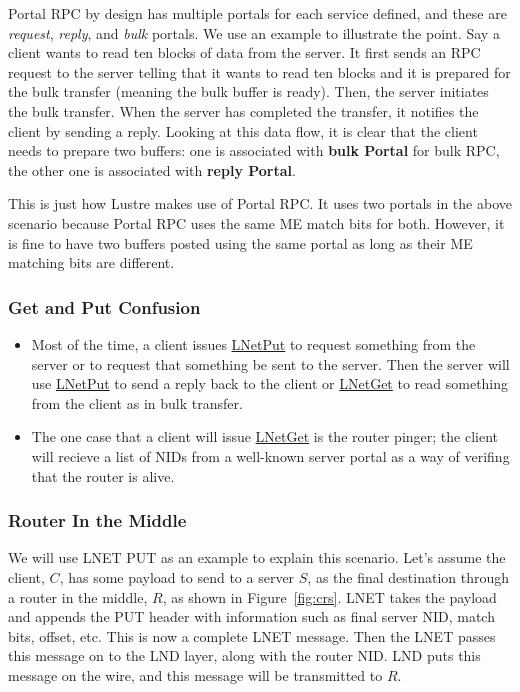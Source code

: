 Portal RPC by design has multiple portals for each service defined, and these
are \textit{request}, \textit{reply}, and \textit{bulk} portals.  We use an
example to illustrate the point. Say a client wants to read ten blocks of data
from the server. It first sends an RPC request to the server telling that it
wants to read ten blocks and it is prepared for the bulk transfer (meaning the
bulk buffer is ready). Then, the server initiates the bulk transfer. When the
server has completed the transfer, it notifies the client by sending a reply.
Looking at this data flow, it is clear that the client needs to prepare two
buffers: one is associated with \textbf{bulk Portal} for bulk RPC, the other
one is associated with \textbf{reply Portal}.

This is just how Lustre makes use of Portal RPC. It uses two portals in the
above scenario because Portal RPC uses the same ME match bits for both.
However, it is fine to have two buffers posted using the same portal as long as
their ME matching bits are different.

\subsubsection*{Get and Put Confusion}

\begin{itemize}

\item Most of the time, a client issues \url{LNetPut} to request something from
the server or to request that something be sent to the server. Then the server will use
\url{LNetPut} to send a reply back to the client or \url{LNetGet} to read
something from the client as in bulk transfer.

\item The one case that a client will issue \url{LNetGet} is the router pinger;
the client will recieve a list of NIDs from a well-known server portal as a way
of verifing that the router is alive.

\end{itemize}

\subsubsection*{Router In the Middle}

We will use LNET PUT as an example to explain this scenario. Let's assume the
client, $C$, has some payload to send to a server $S$, as the final destination
through a router in the middle, $R$, as shown in Figure~\ref{fig:crs}. LNET
takes the payload and appends the PUT header with information such as final
server NID, match bits, offset, etc. This is now a complete LNET message. Then
the LNET passes this message on to the LND layer, along with the router NID. LND
puts this message on the wire, and this message will be
transmitted to $R$. 

